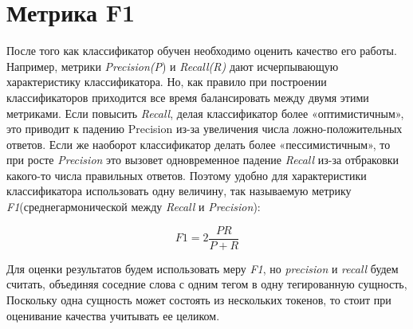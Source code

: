 \documentclass{csmathnotes}
\begin{document}
\section*{Метрика F1}
После того как классификатор обучен необходимо оценить качество его работы. Например, метрики \emph{Precision(P}) и \emph{Recall(R)} дают исчерпывающую характеристику классификатора. Но, как правило при построении классификаторов приходится все время балансировать между двумя этими метриками. Если повысить \emph{Recall}, делая классификатор более «оптимистичным», это приводит к падению Precision из-за увеличения числа ложно-положительных ответов. Если же наоборот классификатор делать более «пессимистичным», то при росте \emph{Precision} это вызовет одновременное падение \emph{Recall} из-за отбраковки какого-то числа правильных ответов. Поэтому удобно для характеристики классификатора использовать одну величину, так называемую метрику \emph{F1}(среднегармонической между \emph{Recall} и \emph{Precision}):

\begin{equation}\label{eq:f1}
F1 = 2\frac{P R}{P + R} 
\end{equation}

Для оценки результатов будем использовать меру \emph{F1}, но \emph{precision} и \emph{recall} будем считать, объединяя соседние слова с одним тегом в одну тегированную сущность, Поскольку одна сущность может состоять из нескольких токенов, то стоит при оценивание качества учитывать ее целиком. 
\end{document}
